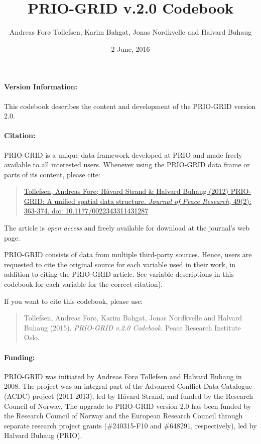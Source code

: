 \documentclass[]{book}
\title{PRIO-GRID v.2.0 Codebook}
\author{Andreas Forø Tollefsen, Karim Bahgat, Jonas Nordkvelle and Halvard
Buhaug}
\date{2 June, 2016}
\begin{document}
\frontmatter
\maketitle

\paragraph{Version Information:}\label{version-information}

This codebook describes the content and development of the PRIO-GRID
version 2.0.

\paragraph{Citation:}\label{citation}

PRIO-GRID is a unique data framework developed at PRIO and made freely
available to all interested users. Whenever using the PRIO-GRID data
frame or parts of its content, please cite:

\begin{quote}
\href{http://jpr.sagepub.com/content/49/2/363}{Tollefsen, Andreas Forø;
Håvard Strand \& Halvard Buhaug (2012) PRIO-GRID: A unified spatial data
structure. \emph{Journal of Peace Research}, 49(2): 363-374. doi:
10.1177/0022343311431287}
\end{quote}

The article is \emph{open access} and freely available for download at
the journal's web page.

PRIO-GRID consists of data from multiple third-party sources. Hence,
users are requested to cite the original source for each variable used
in their work, in addition to citing the PRIO-GRID article. See variable
descriptions in this codebook for each variable for the correct
citation).

If you want to cite this codebook, please use:

\begin{quote}
Tollefsen, Andreas Forø, Karim Bahgat, Jonas Nordkvelle and Halvard
Buhaug (2015). \emph{PRIO-GRID v.2.0 Codebook}. Peace Research Institute
Oslo.
\end{quote}

\paragraph{Funding:}\label{funding}

PRIO-GRID was initiated by Andreas Forø Tollefsen and Halvard Buhaug in
2008. The project was an integral part of the Advanced Conflict Data
Catalogue (ACDC) project (2011-2013), led by Håvard Strand, and funded
by the Research Council of Norway. The upgrade to PRIO-GRID version 2.0
has been funded by the Research Council of Norway and the European
Research Council through separate research project grants (\#240315-F10
and \#648291, respectively), led by Halvard Buhaug (PRIO).
\end{document}
